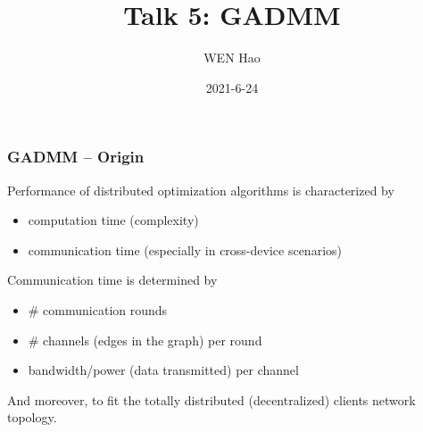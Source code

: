 \usepackage{nccmath}




\title[Personalization]{Talk 5: GADMM}
\date{2021-6-24}
\author[]{WEN Hao}




\setlength{\belowdisplayskip}{5pt} \setlength{\belowdisplayshortskip}{5pt}
\setlength{\abovedisplayskip}{5pt} \setlength{\abovedisplayshortskip}{5pt}


\begin{frame}
\titlepage %
\end{frame}


\begin{frame}
\frametitle{GADMM -- Origin}

Performance of distributed optimization algorithms is characterized by
\begin{itemize}
    \item computation time (complexity)
    \item communication time (especially in cross-device scenarios)
\end{itemize}

\pause
\vspace{0.6em}

Communication time is determined by
\begin{itemize}
    \item \# communication rounds
    \item \# channels (edges in the graph) per round
    \item bandwidth/power (data transmitted) per channel
\end{itemize}

\pause
\vspace{0.6em}

And moreover, to fit the totally distributed (decentralized) clients network topology.

\end{frame}

